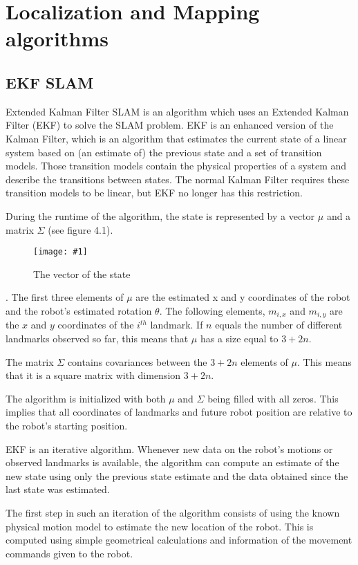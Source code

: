 \documentclass{ba-kecs}
\numberwithin{figure}{section}
\numberwithin{equation}{section}
\newcommand{\dkepic}[2]{ %
	\begin{figure}[H] %
	\texttt{[image: \#1]}
	\caption{#2}
	\label{#1}
	\end{figure}
}
\begin{document}
\section{Localization and Mapping algorithms}

\subsection{EKF SLAM}
Extended Kalman Filter SLAM is an algorithm which uses an Extended Kalman Filter (EKF) to solve the SLAM problem. EKF is an enhanced version of the Kalman Filter, which is an algorithm that estimates the current state of a linear system based on (an estimate of) the previous state and a set of transition models. Those transition models contain the physical properties of a system and describe the transitions between states. The normal Kalman Filter requires these transition models to be linear, but EKF no longer has this restriction.

During the runtime of the algorithm, the state is represented by a vector $\mu$ and a matrix $\Sigma$ (see figure 4.1).
\dkepic{bigMatrix}{The vector of the state \cite{vec}}. 
The first three elements of $\mu$ are the estimated x and y coordinates of the robot and the robot’s estimated rotation $\theta$. The following elements, $m_{i,x}$ and $m_{i,y}$ are the $x$ and $y$ coordinates of the $i^{th}$ landmark. If $n$ equals the number of different landmarks observed so far, this means that $\mu$ has a size equal to $3 + 2n$.

The matrix $\Sigma$ contains covariances between the $3 + 2n$ elements of $\mu$. This means that it is a square matrix with dimension $3 + 2n$.

The algorithm is initialized with both $\mu$ and $\Sigma$ being filled with all zeros. This implies that all coordinates of landmarks and future robot position are relative to the robot’s starting position.

EKF is an iterative algorithm. Whenever new data on the robot’s motions or observed landmarks is available, the algorithm can compute an estimate of the new state using only the previous state estimate and the data obtained since the last state was estimated.

The first step in such an iteration of the algorithm consists of using the known physical motion model to estimate the new location of the robot. This is computed using simple geometrical calculations and information of the movement commands given to the robot.
\end{document}
